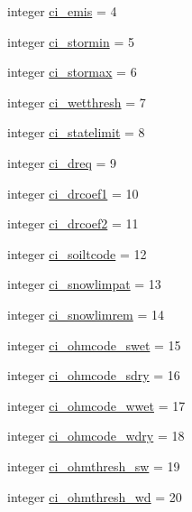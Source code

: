\begin{DoxyCompactItemize}
\item 
integer \hyperlink{namespacecolnamesinputfiles_a1359ce05f67a356edfb639bcf6e5031b}{ci\+\_\+emis} = 4
\item 
integer \hyperlink{namespacecolnamesinputfiles_af7cb4615904fedf637c4334138af6310}{ci\+\_\+stormin} = 5
\item 
integer \hyperlink{namespacecolnamesinputfiles_a2424fca1c17546928c24b46c5469d261}{ci\+\_\+stormax} = 6
\item 
integer \hyperlink{namespacecolnamesinputfiles_af0008ac036ba147383062dec2ade17af}{ci\+\_\+wetthresh} = 7
\item 
integer \hyperlink{namespacecolnamesinputfiles_aff71fdcb640704a6ec1a7931417cf3cf}{ci\+\_\+statelimit} = 8
\item 
integer \hyperlink{namespacecolnamesinputfiles_a5e12cb1fe7d90fe5fa48c25c829202cb}{ci\+\_\+dreq} = 9
\item 
integer \hyperlink{namespacecolnamesinputfiles_adcf82346df376a809e080d0363fc4a87}{ci\+\_\+drcoef1} = 10
\item 
integer \hyperlink{namespacecolnamesinputfiles_acf63a0051e57c26036b890c525d7e99c}{ci\+\_\+drcoef2} = 11
\item 
integer \hyperlink{namespacecolnamesinputfiles_a2042a989056f7623004717542ff037d8}{ci\+\_\+soiltcode} = 12
\item 
integer \hyperlink{namespacecolnamesinputfiles_ab1c12541bcccc9353623fabff4a91d03}{ci\+\_\+snowlimpat} = 13
\item 
integer \hyperlink{namespacecolnamesinputfiles_ac0a61cb76247bffcbe0170dc9f89a4f5}{ci\+\_\+snowlimrem} = 14
\item 
integer \hyperlink{namespacecolnamesinputfiles_a343a0b3e17205259dfd194ad71de4f57}{ci\+\_\+ohmcode\+\_\+swet} = 15
\item 
integer \hyperlink{namespacecolnamesinputfiles_ad5b0b592418fbd15f3a77fef9385728e}{ci\+\_\+ohmcode\+\_\+sdry} = 16
\item 
integer \hyperlink{namespacecolnamesinputfiles_a7fadeb3f54b31cc1fb7ed6612ebf4336}{ci\+\_\+ohmcode\+\_\+wwet} = 17
\item 
integer \hyperlink{namespacecolnamesinputfiles_a62b48f3cc7c912282406d028654618b3}{ci\+\_\+ohmcode\+\_\+wdry} = 18
\item 
integer \hyperlink{namespacecolnamesinputfiles_a8c093c3054c5b97cfd48aa5a2643eccd}{ci\+\_\+ohmthresh\+\_\+sw} = 19
\item 
integer \hyperlink{namespacecolnamesinputfiles_af2567526f99cc8ea7b6408d4725041f3}{ci\+\_\+ohmthresh\+\_\+wd} = 20

\end{DoxyCompactItemize}
